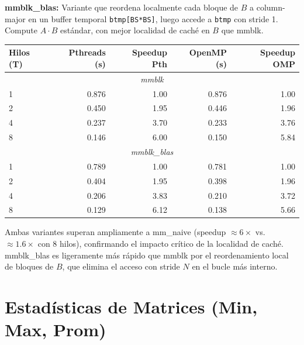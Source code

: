 \documentclass[11pt,a4paper]{article}
\begin{document}
\textbf{mmblk\_blas:} Variante que reordena localmente cada bloque de $B$ a column-major en un buffer temporal \texttt{btmp[BS*BS]}, luego accede a \texttt{btmp} con stride 1. Compute $A \cdot B$ estándar, con mejor localidad de caché en $B$ que mmblk.

\begin{center}
\begin{tabular}{|l|r|r|r|r|}
\hline
\textbf{Hilos (T)} & \textbf{Pthreads (s)} & \textbf{Speedup Pth} & \textbf{OpenMP (s)} & \textbf{Speedup OMP} \\
\hline
\multicolumn{5}{|c|}{\textit{mmblk}} \\
\hline
1 & 0.876 & 1.00 & 0.876 & 1.00 \\
2 & 0.450 & 1.95 & 0.446 & 1.96 \\
4 & 0.237 & 3.70 & 0.233 & 3.76 \\
8 & 0.146 & 6.00 & 0.150 & 5.84 \\
\hline
\multicolumn{5}{|c|}{\textit{mmblk\_blas}} \\
\hline
1 & 0.789 & 1.00 & 0.781 & 1.00 \\
2 & 0.404 & 1.95 & 0.398 & 1.96 \\
4 & 0.206 & 3.83 & 0.210 & 3.72 \\
8 & 0.129 & 6.12 & 0.138 & 5.66 \\
\hline
\end{tabular}
\end{center}

Ambas variantes superan ampliamente a mm\_naive (speedup $\approx 6\times$ vs.\ $\approx 1.6\times$ con 8 hilos), confirmando el impacto crítico de la localidad de caché. mmblk\_blas es ligeramente más rápido que mmblk por el reordenamiento local de bloques de $B$, que elimina el acceso con stride $N$ en el bucle más interno.

\newpage

\section{Estadísticas de Matrices (Min, Max, Prom)}
\end{document}

